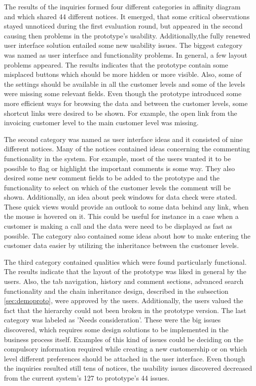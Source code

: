 \documentclass[12pt,a4paper,oneside,pdftex]{report}
\begin{document}
The results of the inquiries formed four different categories in affinity diagram and which shared 44 different notices. It emerged, that some critical observations stayed unnoticed during the first evaluation round, but appeared in the second causing then problems in the prototype's usability. Additionally,the fully renewed user interface solution entailed some new usability issues. The biggest category was named as user interface and functionality problems. In general, a few layout problems appeared. The results indicates that the prototype contain some misplaced buttons which should be more hidden or more visible. Also, some of the settings should be available in all the customer levels and some of the levels were missing some relevant fields. Even though the prototype introduced some more efficient ways for browsing the data and between the customer levels, some shortcut links were desired to be shown. For example, the open link from the invoicing customer level to the main customer level was missing.  

The second category was named as user interface ideas and it consisted of nine different notices. Many of the notices contained ideas concerning the commenting functionality in the system. For example, most of the users wanted it to be possible to flag or highlight the important comments is some way. They also desired some new comment fields to be added to the prototype and the functionality to select on which of the customer levels the comment will be shown. Additionally, an idea about peek windows for data check were stated. These quick views would provide an outlook to some data behind any link, when the mouse is hovered on it. This could be useful for instance in a case when a customer is making a call and the data were need to be displayed as fast as possible. The category also contained some ideas about how to make entering the customer data easier by utilizing the inheritance between the customer levels. 

The third category contained qualities which were found particularly functional. The results indicate that the layout of the prototype was liked in general by the users. Also, the tab navigation, history and comment sections, advanced search functionality and the chain inheritance design, described in the subsection \ref{sec:demoproto}, were approved by the users. Additionally, the users valued the fact that the hierarchy could not been broken in the prototype version. The last category was labeled as 'Needs consideration'. These were the big issues discovered, which requires some design solutions to be implemented in the business process itself. Examples of this kind of issues could be deciding on the compulsory information required while creating a new customership or on which level different preferences should be attached in the user interface. Even though the inquiries resulted still tens of notices, the usability issues discovered decreased from the current system's 127 to prototype's 44 issues. 
\end{document}
